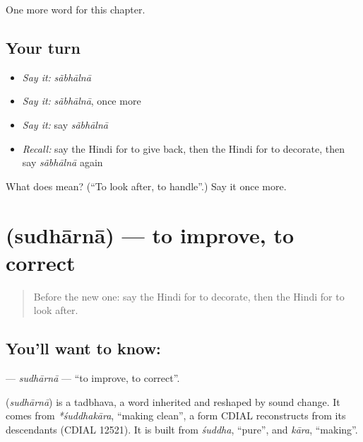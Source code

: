 \begin{grammarlens}[title={What you've built}]
One more word for this chapter.
\end{grammarlens}

\subsection*{Your turn}
\begin{itemize}
\raggedright
  \item \emph{Say it:} \emph{sãbhālnā}
  \item \emph{Say it:} \emph{sãbhālnā}, once more
  \item \emph{Say it:} say \emph{sãbhālnā}
  \item \emph{Recall:} say the Hindi for to give back, then the Hindi for to decorate, then say \emph{sãbhālnā} again
\end{itemize}

\begin{tcolorbox}[breakable,colback=teal!4,colframe=teal!35!black,title={Before you move on}]
What does  mean? (\textquotedblleft{}To look after, to handle\textquotedblright{}.) Say it once more.
\end{tcolorbox}
\section[\texorpdfstring{\hi{सुधारना} (sudhārnā)}{सुधारना (sudhārnā)}]{ (sudhārnā) — to improve, to correct}

\label{lesson:HI-C174-sudharna}



\begin{quote}
Before the new one: say the Hindi for to decorate, then the Hindi for to look after.
\end{quote}

\subsection*{You'll want to know: }
\textbf{} — \emph{sudhārnā} — \textquotedblleft{}to improve, to correct\textquotedblright{}.

\begin{cousinweb}
\textbf{} (\emph{sudhārnā}) is a tadbhava, a word inherited and reshaped by sound change. It comes from \emph{*śuddhakāra}, \textquotedblleft{}making clean\textquotedblright{}, a form CDIAL reconstructs from its descendants (CDIAL 12521). It is built from \emph{śuddha}, \textquotedblleft{}pure\textquotedblright{}, and \emph{kāra}, \textquotedblleft{}making\textquotedblright{}.
\end{cousinweb}


